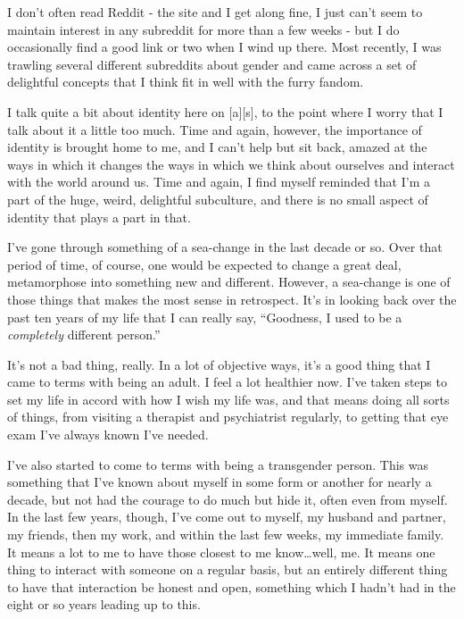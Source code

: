 I don't often read Reddit - the site and I get along fine, I just can't
seem to maintain interest in any subreddit for more than a few weeks -
but I do occasionally find a good link or two when I wind up there. Most
recently, I was trawling several different subreddits about gender and
came across a set of delightful concepts that I think fit in well with
the furry fandom.

I talk quite a bit about identity here on {[}a{]}{[}s{]}, to the point
where I worry that I talk about it a little too much. Time and again,
however, the importance of identity is brought home to me, and I can't
help but sit back, amazed at the ways in which it changes the ways in
which we think about ourselves and interact with the world around us.
Time and again, I find myself reminded that I'm a part of the huge,
weird, delightful subculture, and there is no small aspect of identity
that plays a part in that.

I've gone through something of a sea-change in the last decade or so.
Over that period of time, of course, one would be expected to change a
great deal, metamorphose into something new and different. However, a
sea-change is one of those things that makes the most sense in
retrospect. It's in looking back over the past ten years of my life that
I can really say, ``Goodness, I used to be a \emph{completely} different
person.''

It's not a bad thing, really. In a lot of objective ways, it's a good
thing that I came to terms with being an adult. I feel a lot healthier
now. I've taken steps to set my life in accord with how I wish my life
was, and that means doing all sorts of things, from visiting a therapist
and psychiatrist regularly, to getting that eye exam I've always known
I've needed.

I've also started to come to terms with being a transgender person. This
was something that I've known about myself in some form or another for
nearly a decade, but not had the courage to do much but hide it, often
even from myself. In the last few years, though, I've come out to
myself, my husband and partner, my friends, then my work, and within the
last few weeks, my immediate family. It means a lot to me to have those
closest to me know\ldots{}well, me. It means one thing to interact with
someone on a regular basis, but an entirely different thing to have that
interaction be honest and open, something which I hadn't had in the
eight or so years leading up to this.

